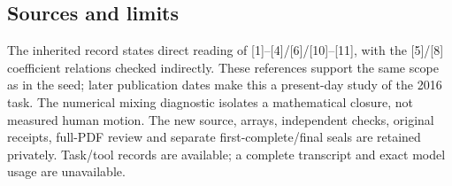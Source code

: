 \documentclass[12pt,a4paper]{article}
\begin{document}
\subsection*{Sources and limits}
The inherited record states direct reading of [1]–[4]/[6]/[10]–[11], with the [5]/[8] coefficient relations checked indirectly. These references support the same scope as in the seed; later publication dates make this a present-day study of the 2016 task. The numerical mixing diagnostic isolates a mathematical closure, not measured human motion. The new source, arrays, independent checks, original receipts, full-PDF review and separate first-complete/final seals are retained privately. Task/tool records are available; a complete transcript and exact model usage are unavailable.
\end{document}
